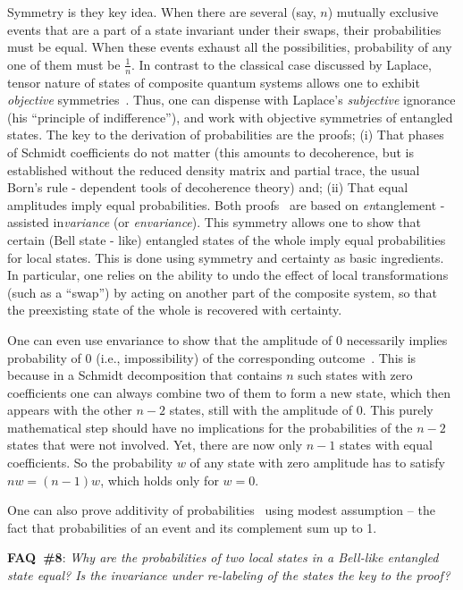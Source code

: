 \documentclass[aps,amsmath,amssymb,amsfonts,12pt]{revtex4-1}
\newcommand{\+}         {\dagger}
\begin{document}
{{{Symmetry is they key idea. When there are several (say, $n$) mutually exclusive events that are a part of a state invariant under their swaps, their probabilities must be equal. When these events exhaust all the possibilities, probability of any one of them must be $\frac 1 n$. In contrast to the classical case discussed by Laplace, tensor nature of states of composite quantum systems allows one to exhibit {\it objective} symmetries~\cite{75,76,78,Z07a}. Thus, one can dispense with Laplace's  {\it subjective} ignorance (his ``principle of indifference''), and work with objective symmetries of entangled states. The key to the derivation of probabilities are the proofs; (i) That phases of Schmidt coefficients do not matter (this amounts to decoherence, but is established without the reduced density matrix and partial trace, the usual Born's rule - dependent tools of decoherence theory) and; (ii) That equal amplitudes imply equal probabilities. Both proofs~\cite{75,76,78,Z07a} are based on {\it en}tanglement - assisted in{\it variance} (or {\it envariance}). This symmetry allows one to show that certain (Bell state - like) entangled states of the whole imply equal probabilities for local states. This is done using symmetry and certainty as basic ingredients. In particular, one relies on the ability to undo the effect of local transformations (such as a ``swap'') by acting on another part of the composite system, so that the preexisting state of the whole is recovered with certainty. 

One can even use envariance to show that the amplitude of 0 necessarily implies probability of 0 (i.e., impossibility) of the corresponding outcome~\cite{Z07a}. This is because in a Schmidt decomposition that contains $n$ such states with zero coefficients one can always combine two of them to form a new state, which then appears with the other $n-2$ states, still with the amplitude of 0. This purely mathematical step should have no implications for the probabilities of the $n-2$ states that were not involved. Yet, there are now only $n-1$ states with equal coefficients. So the probability $w$ of any state with zero amplitude has to satisfy $nw = (n-1)w$, which holds only for $w=0$. 

One can also prove additivity of probabilities~\cite{78} using modest assumption -- the fact that probabilities of an event and its complement sum up to 1.

{\bf FAQ~\#8}: {\it Why are the probabilities of two local states in a Bell-like entangled state equal? Is the invariance under re-labeling of the states the key to the proof?} 

}}}
\end{document}
